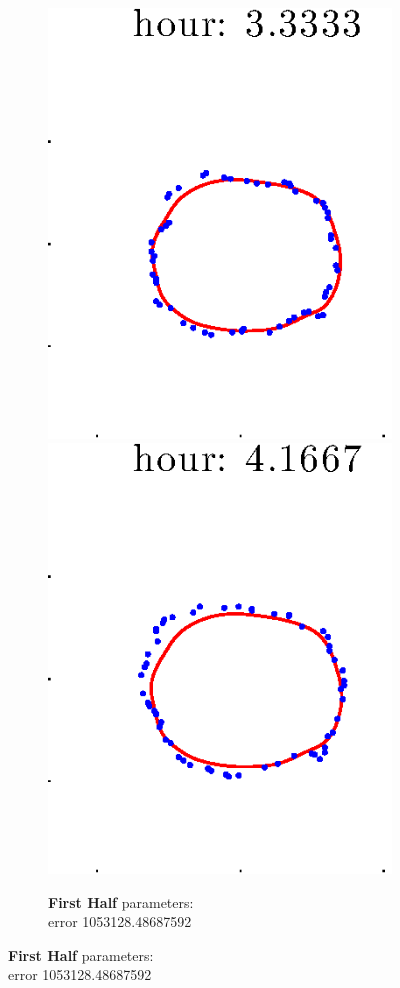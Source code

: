 \documentclass[12pt]{article}
\begin{document}
\begin{figure}[h!]
\begin{subfigure}[b]{.3\textwidth}
		\includegraphics[height=.15\textheight]{Pos10exp2/firsthalf/first5.eps}
		\includegraphics[height=.15\textheight]{Pos10exp2/firsthalf/first6.eps}
		\caption{\textbf{First Half} parameters: \\error 1053128.48687592}

\end{subfigure}
\end{figure}
\end{document}
